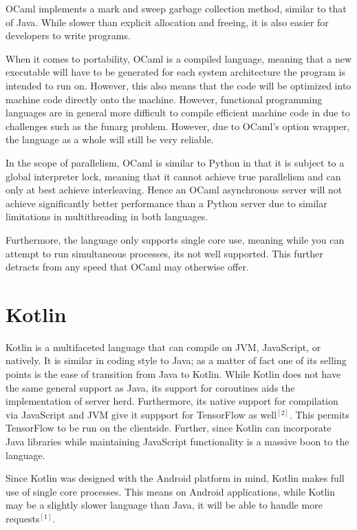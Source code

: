 OCaml implements a mark and sweep garbage collection method, similar to that of Java. While slower than explicit allocation and freeing, it is also easier for developers to write programs.

When it comes to portability, OCaml is a compiled language, meaning that a new executable will have to be generated for each system architecture the program is intended to run on. However, this also means that the code will be optimized into machine code directly onto the machine. However, functional programming languages are in general more difficult to compile efficient machine code in due to challenges such as the funarg problem. However, due to OCaml's option wrapper, the language as a whole will still be very reliable.

In the scope of parallelism, OCaml is similar to Python in that it is subject to a global interpreter lock, meaning that it cannot achieve true parallelism and can only at best achieve interleaving. Hence an OCaml asynchronous server will not achieve significantly better performance than a Python server due to similar limitations in multithreading in both languages.

Furthermore, the language only supports single core use, meaning while you can attempt to run simultaneous processes, its not well supported. This further detracts from any speed that OCaml may otherwise offer.

\section{Kotlin}

Kotlin is a multifaceted language that can compile on JVM, JavaScript, or natively. It is similar in coding style to Java; as a matter of fact one of its selling points is the ease of transition from Java to Kotlin. While Kotlin does not have the same general support as Java, its support for coroutines aids the implementation of server herd. Furthermore, its native support for compilation via JavaScript and JVM give it suppport for TensorFlow as well$^{[2]}$. This permits TensorFlow to be run on the clientside. Further, since Kotlin can incorporate Java libraries while maintaining JavaScript functionality is a massive boon to the language.

Since Kotlin was designed with the Android platform in mind, Kotlin makes full use of single core processes. This means on Android applications, while Kotlin may be a slightly slower language than Java, it will be able to handle more requests$^{[1]}$.

